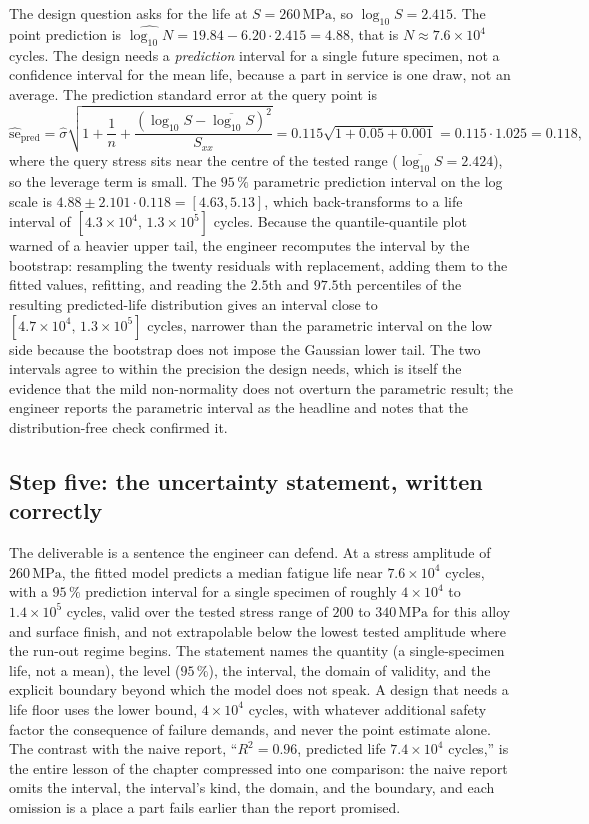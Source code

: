 The design question asks for the life at $S = 260\,\si{\mega\pascal}$,
so $\log_{10} S = 2.415$. The point prediction is $\widehat{\log_{10}
N} = 19.84 - 6.20 \cdot 2.415 = 4.88$, that is $N \approx 7.6 \times
10^{4}$ cycles. The design needs a \emph{prediction} interval for a
single future specimen, not a confidence interval for the mean life,
because a part in service is one draw, not an average. The prediction
standard error at the query point is
\[
\widehat{\mathrm{se}}_{\mathrm{pred}} = \hat{\sigma}\sqrt{1 +
\frac{1}{n} + \frac{(\log_{10} S - \overline{\log_{10} S})^{2}}
{S_{xx}}}
= 0.115\sqrt{1 + 0.05 + 0.001} = 0.115 \cdot 1.025 = 0.118,
\]
where the query stress sits near the centre of the tested range
($\overline{\log_{10} S} = 2.424$), so the leverage term is small.
The $95\,\%$ parametric prediction interval on the log scale is
$4.88 \pm 2.101 \cdot 0.118 = [4.63, 5.13]$, which back-transforms
to a life interval of $[4.3 \times 10^{4},\, 1.3 \times 10^{5}]$
cycles. Because the quantile-quantile
plot warned of a heavier upper tail, the engineer recomputes the
interval by the bootstrap: resampling the twenty residuals with
replacement, adding them to the fitted values, refitting, and reading
the $2.5$th and $97.5$th percentiles of the resulting predicted-life
distribution gives an interval close to $[4.7 \times 10^{4},\, 1.3
\times 10^{5}]$ cycles, narrower than the parametric interval on the
low side because the bootstrap does not impose the Gaussian lower
tail. The two intervals agree to within the precision the design
needs, which is itself the evidence that the mild non-normality does
not overturn the parametric result; the engineer reports the
parametric interval as the headline and notes that the
distribution-free check confirmed it.

\subsection{Step five: the uncertainty statement, written correctly}

The deliverable is a sentence the engineer can defend. At a stress
amplitude of $260\,\si{\mega\pascal}$, the fitted model predicts a
median fatigue life near $7.6 \times 10^{4}$ cycles, with a $95\,\%$
prediction interval for a single specimen of roughly $4 \times
10^{4}$ to $1.4 \times 10^{5}$ cycles, valid over the tested stress
range of $200$ to $340\,\si{\mega\pascal}$ for this alloy and surface
finish, and not extrapolable below the lowest tested amplitude where
the run-out regime begins. The statement names the quantity (a
single-specimen life, not a mean), the level ($95\,\%$), the
interval, the domain of validity, and the explicit boundary beyond
which the model does not speak. A design that needs a life floor uses
the lower bound, $4 \times 10^{4}$ cycles, with whatever additional
safety factor the consequence of failure demands, and never the point
estimate alone. The contrast with the naive report, ``$R^{2} = 0.96$,
predicted life $7.4 \times 10^{4}$ cycles,'' is the entire lesson of
the chapter compressed into one comparison: the naive report omits
the interval, the interval's kind, the domain, and the boundary, and
each omission is a place a part fails earlier than the report
promised.

